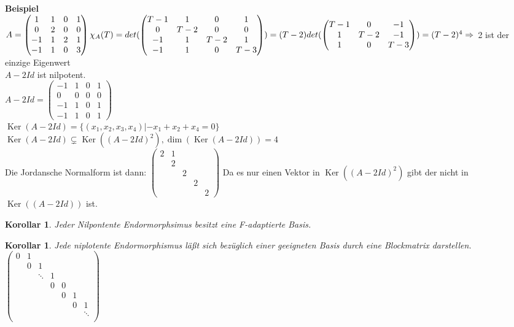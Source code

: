 \documentclass{report}
\newcommand{\ve}[1]{{\begin{pmatrix}#1 \end{pmatrix}}}
\DeclareMathOperator{\Ker}{Ker}
\theoremstyle{customrem}
\theoremstyle{customdef}
\newtheorem{korrolar}[definition]{Korollar}
\theoremstyle{customenv}
\begin{document}
\textbf{Beispiel}\\
\(A =
\begin{pmatrix}
1  & 1 & 0 & 1\\
0  & 2 & 0 & 0\\
-1 & 1 & 2 & 1\\
-1 & 1 & 0 & 3
\end{pmatrix}\\
\chi_A(T) = det(\begin{pmatrix}
T - 1  & 1 & 0 & 1\\
0  & T - 2 & 0 & 0\\
-1 & 1 & T - 2 & 1\\
-1 & 1 & 0 & T - 3
\end{pmatrix}) = (T-2) det(\ve{T-1&0&-1\\1&T-2&-1\\1&0&T-3})
= (T-2)^4 \Rightarrow\) 2 ist der einzige Eigenwert\\
\(A - 2Id\) ist nilpotent.\\
\(A - 2Id = \begin{pmatrix}
-1  & 1 & 0 & 1\\
0  & 0 & 0 & 0\\
-1 & 1 & 0 & 1\\
-1 & 1 & 0 & 1
\end{pmatrix}\)\\
\(\Ker(A - 2Id) = \{(x_1, x_2, x_3, x_4) | -x_1 + x_2 + x_4 = 0\}\)\\
\(
\Ker(A - 2Id) \subsetneq \Ker((A - 2Id)^2), \dim(\Ker(A - 2Id)) = 4\)\\
Die Jordansche Normalform ist dann:
\(
\begin{pmatrix}
2 & 1\\
  & 2\\
  &   & 2\\
  &   &   & 2\\
  &   &   &   & 2
\end{pmatrix}
\)
Da es nur einen Vektor in \(\Ker((A - 2Id)^2)\) gibt der nicht in \(\Ker((A - 2Id))\) ist.

\begin{korrolar}
  Jeder Nilpontente Endormorphsimus besitzt eine F-adaptierte Basis.
\end{korrolar}

\begin{korrolar}
  Jede niplotente Endormorphismus l\"a\ss{}t sich bez\"uglich einer geeigneten
  Basis durch eine Blockmatrix darstellen.
  \(
  \begin{pmatrix}
    0&1\\
    &0&1\\
    & &\ddots&1\\
    &&&0&0\\
    &&&&0&1\\
    &&&&&0 & 1\\
    &&&&&&\ddots\\
  \end{pmatrix}\)
\end{korrolar}
\end{document}
